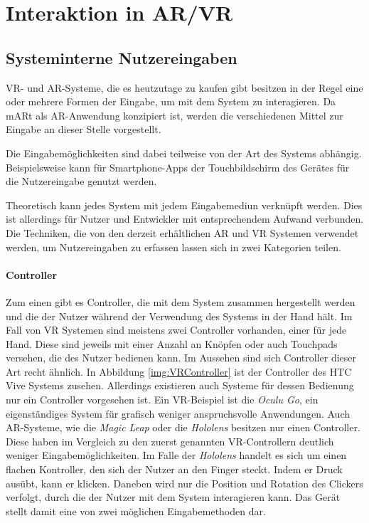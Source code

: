 \section{Interaktion in AR/VR}	
\label{VRInteraktion}							 %
\subsection{Systeminterne Nutzereingaben}

VR- und AR-Systeme, die es heutzutage zu kaufen gibt besitzen in der Regel  eine oder mehrere Formen der Eingabe, um mit dem System zu interagieren. Da mARt als AR-Anwendung konzipiert ist, werden die verschiedenen Mittel zur Eingabe an dieser Stelle vorgestellt.

Die Eingabemöglichkeiten sind dabei teilweise von der Art des Systems abhängig. 
Beispielsweise kann für Smartphone-Apps der Touchbildschirm des Gerätes für die Nutzereingabe genutzt werden. 

Theoretisch kann jedes System mit jedem Eingabemediun verknüpft werden. Dies ist allerdings für Nutzer und Entwickler mit entsprechendem Aufwand verbunden. Die Techniken, die von den derzeit erhältlichen AR und VR Systemen verwendet werden, um Nutzereingaben zu erfassen lassen sich in zwei Kategorien teilen. 
\paragraph{Controller}
Zum einen gibt es Controller, die mit dem System zusammen hergestellt werden und die der Nutzer während der Verwendung des Systems in der Hand hält. Im Fall von VR Systemen sind meistens zwei Controller vorhanden, einer für jede Hand. Diese sind jeweils mit einer Anzahl an Knöpfen oder auch Touchpads versehen, die des Nutzer bedienen kann. Im Aussehen sind sich Controller dieser Art recht ähnlich. In Abbildung \ref{img:VRController} ist der Controller des HTC Vive Systems zusehen.
Allerdings existieren auch Systeme für dessen Bedienung nur ein Controller vorgesehen ist. Ein VR-Beispiel ist die \textit{Oculu Go}, ein eigenständiges System für grafisch weniger anspruchsvolle Anwendungen. 
Auch AR-Systeme, wie die \textit{Magic Leap} oder die \textit{Hololens} besitzen nur einen Controller. Diese haben im Vergleich zu den zuerst genannten VR-Controllern deutlich weniger Eingabemöglichkeiten. Im Falle der \textit{Hololens} handelt es sich um einen flachen Kontroller, den sich der Nutzer an den Finger steckt. Indem er Druck ausübt, kann er klicken. Daneben wird nur die Position und Rotation des Clickers verfolgt, durch die der Nutzer mit dem System interagieren kann. Das Gerät stellt damit eine von zwei möglichen Eingabemethoden dar. 

